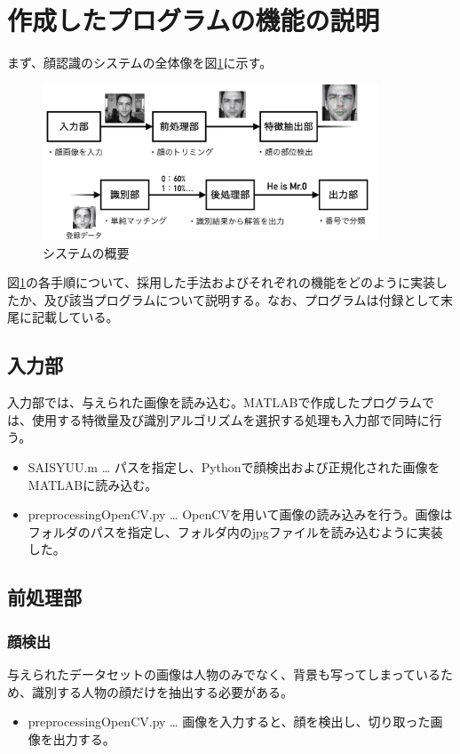 \documentclass[10.5pt,a4j]{jarticle}
\begin{document}
	\section{作成したプログラムの機能の説明}
	まず、顔認識のシステムの全体像を図\ref{system}に示す。
	\begin{figure}[H]
		\centering
		\includegraphics[width=10cm,clip]{images/system.jpg}
		\caption{システムの概要}
		\label{system}
	\end{figure}
	図\ref{system}の各手順について、採用した手法およびそれぞれの機能をどのように実装したか、及び該当プログラムについて説明する。なお、プログラムは付録として末尾に記載している。
	\subsection{入力部}
	入力部では、与えられた画像を読み込む。MATLABで作成したプログラムでは、使用する特徴量及び識別アルゴリズムを選択する処理も入力部で同時に行う。

	\begin{itemize}
		\item SAISYUU.m … パスを指定し、Pythonで顔検出および正規化された画像をMATLABに読み込む。
		\item preprocessingOpenCV.py … OpenCVを用いて画像の読み込みを行う。画像はフォルダのパスを指定し、フォルダ内のjpgファイルを読み込むように実装した。
	\end{itemize}
	\subsection{前処理部}
	\subsubsection{顔検出}
	与えられたデータセットの画像は人物のみでなく、背景も写ってしまっているため、識別する人物の顔だけを抽出する必要がある。

	\begin{itemize}
		\item preprocessingOpenCV.py … 画像を入力すると、顔を検出し、切り取った画像を出力する。
	\end{itemize}
\end{document}
